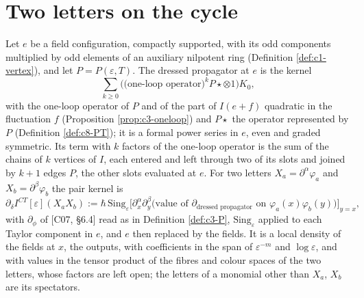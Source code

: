 \section{Two letters on the cycle}

\begin{definition}
\label{def:c10-pair}
Let $e$ be a field configuration, compactly supported, with its odd components multiplied by odd elements of an auxiliary nilpotent ring (Definition \ref{def:c1-vertex}), and let $P=P(\varepsilon,T)$. The dressed propagator at $e$ is the kernel
\[
\sum_{k\ge0}\Big(\big(\text{one-loop operator}\big)^kP\star\otimes1\Big)K_0,
\]
with the one-loop operator of $P$ and of the part of $I(e+f)$ quadratic in the fluctuation $f$ (Proposition \ref{prop:c3-oneloop}) and $P\star$ the operator represented by $P$ (Definition \ref{def:c8-PT}); it is a formal power series in $e$, even and graded symmetric. Its term with $k$ factors of the one-loop operator is the sum of the chains of $k$ vertices of $I$, each entered and left through two of its slots and joined by $k+1$ edges $P$, the other slots evaluated at $e$. For two letters $X_a=\partial^\alpha\varphi_a$ and $X_b=\partial^\beta\varphi_b$ the pair kernel is
\begin{equation}
\partial_\delta I^{CT}[\varepsilon](X_aX_b):=\hbar\,\mathrm{Sing}_\varepsilon\Big[\partial^\alpha_x\partial^\beta_y\Big(\text{value of }\partial_{\text{dressed propagator}}\text{ on }\varphi_a(x)\varphi_b(y)\Big)\Big]_{y=x},
\label{eq:c10-kernel}
\end{equation}
with $\partial_\phi$ of [C07, §6.4] read as in Definition \ref{def:c3-P}, $\mathrm{Sing}_\varepsilon$ applied to each Taylor component in $e$, and $e$ then replaced by the fields. It is a local density of the fields at $x$, the outputs, with coefficients in the span of $\varepsilon^{-m}$ and $\log\varepsilon$, and with values in the tensor product of the fibres and colour spaces of the two letters, whose factors are left open; the letters of a monomial other than $X_a$, $X_b$ are its spectators.
\end{definition}

